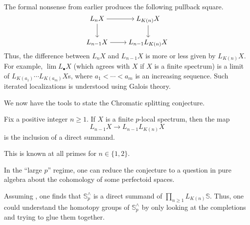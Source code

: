 \documentclass[../notes.tex]{subfiles}
\begin{document}
\begin{remark}
	The formal nonsense from earlier produces the following pullback square.
	\[\begin{tikzcd}[cramped]
		{L_nX} & {L_{K(n)}X} \\
		{L_{n-1}X} & {L_{n-1}L_{K(n)}X}
		\arrow[from=1-1, to=1-2]
		\arrow[from=1-1, to=2-1]
		\arrow[from=1-2, to=2-2]
		\arrow[from=2-1, to=2-2]
	\end{tikzcd}\]
	Thus, the difference between $L_nX$ and $L_{n-1}X$ is more or less given by $L_{K(n)}X$. For example, $\lim L_\bullet X$ (which agrees with $X$ if $X$ is a finite spectrum) is a limit of $L_{K(a_1)}\cdots L_{K(a_m)}X$s, where $a_1<\cdots<a_m$ is an increasing sequence. Such iterated localizations is understood using Galois theory.
\end{remark}
We now have the tools to state the Chromatic splitting conjecture.
\begin{conj} \label{conj:chromatic-splitting-again}
	Fix a positive integer $n\ge1$. If $X$ is a finite $p$-local spectrum, then the map
	\[L_{n-1}X\to L_{n-1}L_{K(n)}X\]
	is the inclusion of a direct summand.
\end{conj}
\begin{remark}
	This is known at all primes for $n\in\{1,2\}$.
\end{remark}
In the ``large $p$'' regime, one can reduce the conjecture to a question in pure algebra about the cohomology of some perfectoid spaces.
\begin{remark}
	Assuming , one finds that $\mathbb S_p^\land$ is a direct summand of $\prod_{n\ge1}L_{K(n)}\mathbb S$. Thus, one could understand the homotopy groups of $\mathbb S_p^\land$ by only looking at the completions and trying to glue them together.
\end{remark}
\end{document}
